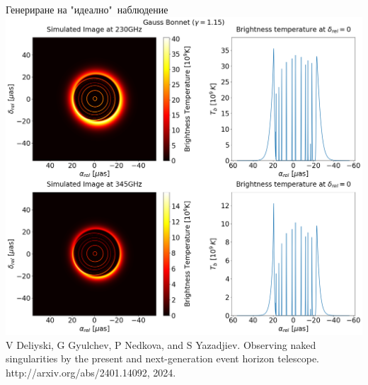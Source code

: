 \documentclass[hyperref={colorlinks,citecolor=blue,linkcolor=blue,urlcolor=blue}]{beamer}
\begin{document}
	\begin{frame}{Генериране на "идеално"$\,$ наблюдение}
		\centering
		\includegraphics[scale = 0.18]{Pre-Defence/Ray_tracer_plot_230_345.png}\\
		
		\tiny V Deliyski, G Gyulchev, P Nedkova, and S Yazadjiev.
		Observing naked singularities by the present and next-generation event horizon
		telescope. http://arxiv.org/abs/2401.14092, 2024.
	\end{frame}
	
\end{document}

